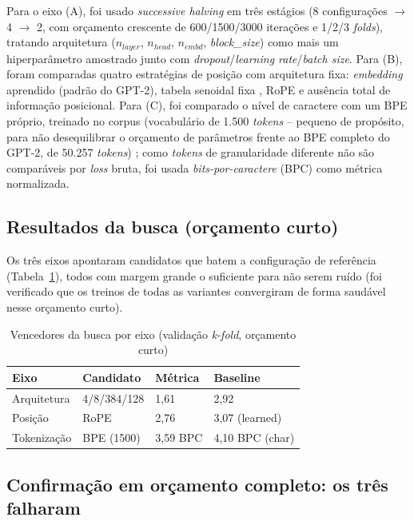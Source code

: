 \documentclass[conference]{IEEEtran}
\begin{document}
Para o eixo (A), foi usado \textit{successive halving} em três estágios (8
configurações $\rightarrow$ 4 $\rightarrow$ 2, com orçamento crescente de
600/1500/3000 iterações e 1/2/3 \textit{folds}), tratando arquitetura
($n_{layer}$, $n_{head}$, $n_{embd}$, \textit{block\_size}) como mais um
hiperparâmetro amostrado junto com \textit{dropout}/\textit{learning
rate}/\textit{batch size}. Para (B), foram comparadas quatro estratégias de
posição com arquitetura fixa: \textit{embedding} aprendido (padrão do GPT-2),
tabela senoidal fixa \cite{vaswani2017attention}, RoPE
\cite{su2021roformer} e ausência total de informação posicional. Para (C),
foi comparado o nível de caractere com um BPE próprio, treinado no corpus
(vocabulário de 1.500 \textit{tokens} -- pequeno de propósito, para não
desequilibrar o orçamento de parâmetros frente ao BPE completo do GPT-2, de
50.257 \textit{tokens}) \cite{sennrich2016bpe}; como \textit{tokens} de
granularidade diferente não são comparáveis por \textit{loss} bruta, foi usada
\textit{bits-por-caractere} (BPC) como métrica normalizada.

\subsection{Resultados da busca (orçamento curto)}

Os três eixos apontaram candidatos que batem a configuração de referência
(Tabela~\ref{tab:busca}), todos com margem grande o suficiente para não
serem ruído (foi verificado que os treinos de todas as variantes convergiram de
forma saudável nesse orçamento curto).

\begin{table}[!t]
\centering
\caption{Vencedores da busca por eixo (validação \textit{k-fold}, orçamento curto)}
\label{tab:busca}
\begin{tabular}{@{}llll@{}}
\toprule
Eixo & Candidato & Métrica & Baseline \\
\midrule
Arquitetura & 4/8/384/128\footnotemark[2] & 1,61 & 2,92 \\
Posição & RoPE & 2,76 & 3,07 (learned) \\
Tokenização & BPE (1500) & 3,59 BPC & 4,10 BPC (char) \\
\bottomrule
\end{tabular}
\end{table}

\subsection{Confirmação em orçamento completo: os três falharam}
\label{sec:falha}
\end{document}

